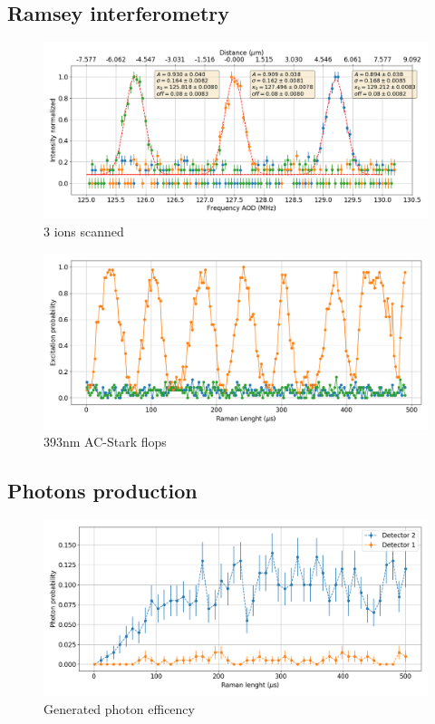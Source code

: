 \subsection{Ramsey interferometry}
\begin{figure}[H]
\centering
\includegraphics[width=\textwidth]{img/AODscan}
\caption{3 ions scanned}
\end{figure}
\begin{figure}[H]
\centering
\includegraphics[width=\textwidth]{img/ac_stark}
\caption{393nm AC-Stark flops}
\end{figure}

\subsection{Photons production}
\begin{figure}[H]
\centering
\includegraphics[width=\textwidth]{img/photonefficency_witherror}
\caption{Generated photon efficency}
\end{figure}

